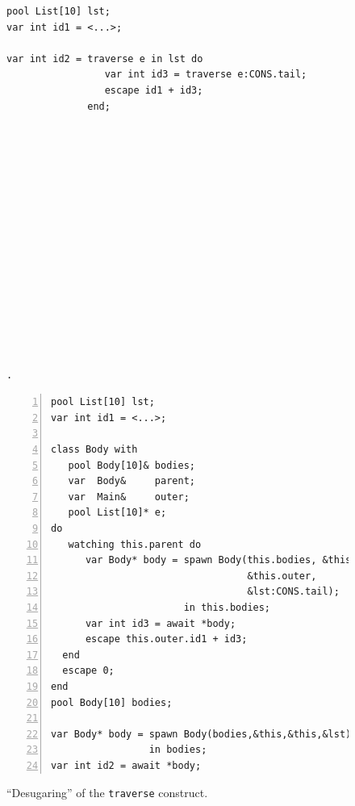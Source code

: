 \documentclass{sig-alternate}
\newcommand{\code}[1] {{\small{\texttt{#1}}}}
\begin{document}
\begin{figure}%
\begin{minipage}[t]{0.45\linewidth}
\begin{lstlisting}[title=CODE-1: Original code (with \code{traverse})]
pool List[10] lst;
var int id1 = <...>;

var int id2 = traverse e in lst do
                 var int id3 = traverse e:CONS.tail;
                 escape id1 + id3;
              end;
















.
\end{lstlisting}
\end{minipage}
%
\begin{minipage}[t]{0.51\linewidth}
\begin{lstlisting}[numbers=left,xleftmargin=3.5em,title=CODE-2: Expanded code (without \code{traverse})]
pool List[10] lst;
var int id1 = <...>;

class Body with
   pool Body[10]& bodies;
   var  Body&     parent;
   var  Main&     outer;
   pool List[10]* e;
do
   watching this.parent do
      var Body* body = spawn Body(this.bodies, &this,
                                  &this.outer,
                                  &lst:CONS.tail);
                       in this.bodies;
      var int id3 = await *body;
      escape this.outer.id1 + id3;
  end
  escape 0;
end
pool Body[10] bodies;

var Body* body = spawn Body(bodies,&this,&this,&lst)
                 in bodies;
var int id2 = await *body;
\end{lstlisting}
\end{minipage}
%
\caption{ ``Desugaring'' of the \code{traverse} construct.
\label{lst.expansion}
}
\end{figure}
\end{document}
